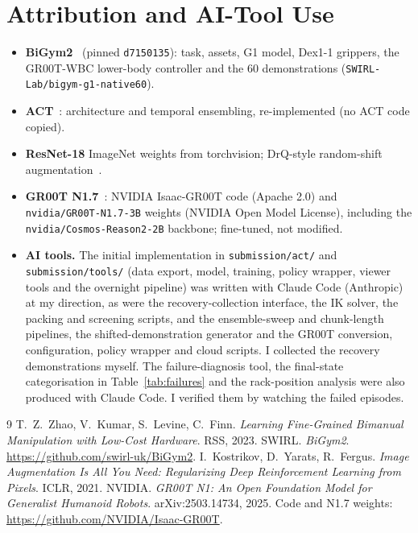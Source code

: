 \documentclass[11pt,a4paper]{article}
\begin{document}
\section{Attribution and AI-Tool Use}

\begin{itemize}
  \item \textbf{BiGym2}~\cite{bigym2} (pinned \texttt{d7150135}): task,
        assets, G1 model, Dex1-1 grippers, the GR00T-WBC lower-body controller and the 60
        demonstrations (\texttt{SWIRL-Lab/bigym-g1-native60}).
  \item \textbf{ACT}~\cite{zhao2023act}: architecture and temporal
        ensembling, re-implemented (no ACT code copied).
  \item \textbf{ResNet-18} ImageNet weights from torchvision; DrQ-style
        random-shift augmentation~\cite{kostrikov2021drq}.
  \item \textbf{GR00T N1.7}~\cite{groot}: NVIDIA Isaac-GR00T code (Apache
        2.0) and \texttt{nvidia/GR00T-N1.7-3B} weights (NVIDIA Open Model
        License), including the \texttt{nvidia/Cosmos-Reason2-2B} backbone;
        fine-tuned, not modified.
  \item \textbf{AI tools.} The initial implementation in
        \texttt{submission/act/} and \texttt{submission/tools/} (data
        export, model, training, policy wrapper, viewer tools and the
        overnight pipeline) was written with Claude Code (Anthropic) at my
        direction, as were the recovery-collection interface, the IK solver,
        the packing and screening scripts, and the ensemble-sweep and
        chunk-length pipelines, the shifted-demonstration generator and the
        GR00T conversion, configuration, policy wrapper and cloud scripts.
        I collected the recovery demonstrations
        myself. The failure-diagnosis tool, the final-state
        categorisation in Table~\ref{tab:failures} and the rack-position
        analysis were also produced with Claude Code. I verified them by
        watching the failed episodes.
\end{itemize}

\begin{thebibliography}{9}
 T.~Z.~Zhao, V.~Kumar, S.~Levine, C.~Finn.
  \emph{Learning Fine-Grained Bimanual Manipulation with Low-Cost Hardware}.
  RSS, 2023.
 SWIRL. \emph{BiGym2}.
  \url{https://github.com/swirl-uk/BiGym2}.
 I.~Kostrikov, D.~Yarats, R.~Fergus.
  \emph{Image Augmentation Is All You Need: Regularizing Deep Reinforcement
  Learning from Pixels}. ICLR, 2021.
 NVIDIA. \emph{GR00T N1: An Open Foundation Model for
  Generalist Humanoid Robots}. arXiv:2503.14734, 2025. Code and N1.7 weights:
  \url{https://github.com/NVIDIA/Isaac-GR00T}.
\end{thebibliography}
\end{document}
